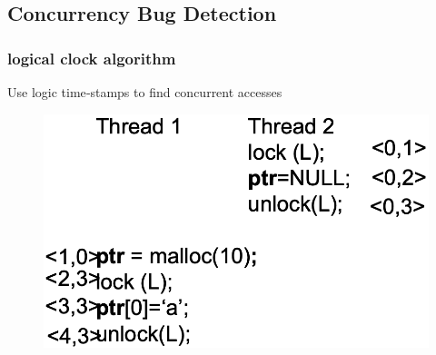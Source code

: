 % 
% 
% 
% 
\subsection{Concurrency Bug Detection} %
% 
%         
% 
% 
% 
% 
% 
% 
% 
% 
% 
\begin{frame}[fragile]
    \frametitle{logical clock algorithm}

Use logic time‐stamps to find concurrent accesses
\pause
    \begin{figure}
    \includegraphics[width=0.45\linewidth]{figs/Happen‐before.png}
    \end{figure}
\end{frame}
